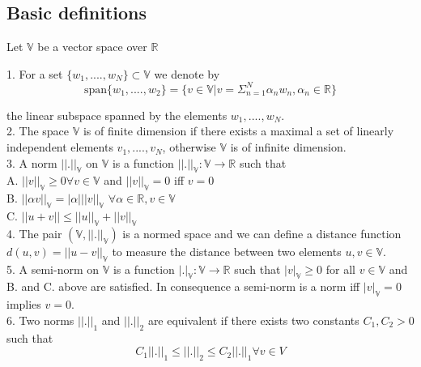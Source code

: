 \documentclass[a4paper,12pt]{book}
\begin{document}
\subsection{Basic definitions}\cite{crbm}

Let $\mathbb{V}$ be a vector space over $\mathbb{R}$

1. For a set $\lbrace w_1,....,w_N \rbrace \subset \mathbb{V}$ we denote by \\
\begin{equation} \label{vector space}
\mathrm{span} \lbrace w_1,....,w_2 \rbrace = \lbrace v \in \mathbb{V} | v = \Sigma_{n=1}^N \alpha_n w_n, \alpha_n \in \mathbb{R} \rbrace
\end{equation} 

the linear subspace spanned by the elements $w_1,....,w_N$.\\

2. The space $\mathbb{V}$ is of finite dimension if there exists a maximal a set of linearly independent elements $v_1,....,v_N$, otherwise $\mathbb{V}$ is of infinite dimension.\\

3. A norm $||.||_\mathbb{V}$ on $\mathbb{V}$ is a function $||.||_\mathbb{V} : \mathbb{V} \rightarrow \mathbb{R}$ such that\\ 
A. $||v||_\mathbb{V} \geq 0 \forall v \in \mathbb{V}$ and $||v||_\mathbb{V} = 0$ iff $v=0$\\
B. $||\alpha v||_\mathbb{V} = |\alpha| ||v||_\mathbb{V}$  $\forall \alpha \in \mathbb{R}, v \in \mathbb{V}$\\
C. $||u+v|| \leq ||u||_\mathbb{V} + ||v||_\mathbb{V}$\\

4. The pair $(\mathbb{V},||.||_\mathbb{V})$ is a normed space and we can define a distance function $d(u,v) = ||u-v||_\mathbb{V}$ to measure the distance between two elements $u,v \in \mathbb{V}$.\\

5. A semi-norm on $\mathbb{V}$ is a function $|.|_\mathbb{V} : \mathbb{V} \rightarrow \mathbb{R}$ such that $|v|_\mathbb{V} \geq 0$ for all $v \in \mathbb{V}$ and B. and C. above are satisfied. In consequence a semi-norm is a norm iff $|v|_\mathbb{V} = 0$ implies  $v = 0$.\\

6. Two norms $||.||_1$ and $||.||_2$ are equivalent if there exists two constants $C_1,C_2 > 0$ such that \\

\begin{equation} \label{norm_equivalent}
C_1||.||_1 \leq ||.||_2 \leq C_2 ||.||_1 \forall v \in V
\end{equation}
\end{document}
